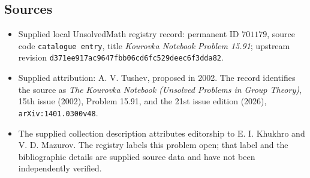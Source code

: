 \documentclass[11pt]{article}
\begin{document}
\subsection{Sources}
\begin{itemize}
\item Supplied local UnsolvedMath registry record: permanent ID \(701179\), source code \texttt{catalogue entry}, title \emph{Kourovka Notebook Problem 15.91}; upstream revision \texttt{d371ee917ac9647fbb06cd6fc529deec6f3dda82}.
\item Supplied attribution: A. V. Tushev, proposed in 2002. The record identifies the source as \emph{The Kourovka Notebook (Unsolved Problems in Group Theory)}, 15th issue (2002), Problem 15.91, and the 21st issue edition (2026), \texttt{arXiv:1401.0300v48}.
\item The supplied collection description attributes editorship to E. I. Khukhro and V. D. Mazurov. The registry labels this problem open; that label and the bibliographic details are supplied source data and have not been independently verified.
\end{itemize}
\end{document}
